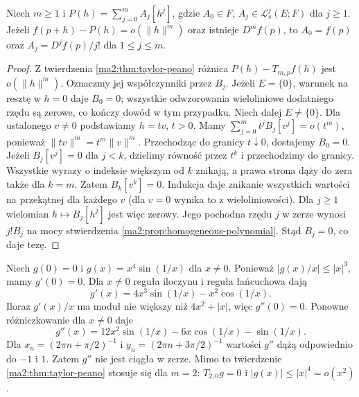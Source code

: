 \begin{stwierdzenie}
\label{ma2:prop:taylor-uniqueness}
Niech $m\ge1$ i $P(h)=\sum_{j=0}^m A_j[h^j]$,
gdzie $A_0\in F$, $A_j\in\mathcal L_s^j(E;F)$
dla $j\ge1$. Jeżeli $f(p+h)-P(h)=o(\|h\|^m)$
oraz istnieje $D^mf(p)$, to $A_0=f(p)$ oraz
$A_j=D^jf(p)/j!$ dla $1\le j\le m$.
\end{stwierdzenie}
\begin{proof}
Z twierdzenia \ref{ma2:thm:taylor-peano} różnica
$P(h)-T_{m,p}f(h)$ jest $o(\|h\|^m)$.
Oznaczmy jej współczynniki przez $B_j$.
Jeżeli $E=\{0\}$, warunek na resztę w $h=0$
daje $B_0=0$; wszystkie odwzorowania wieloliniowe
dodatniego rzędu są zerowe, co kończy dowód w tym przypadku.
Niech dalej $E\ne\{0\}$. Dla ustalonego $v\ne0$
podstawiamy $h=tv$, $t>0$. Mamy
$\sum_{j=0}^m t^j B_j[v^j]=o(t^m)$, ponieważ
$\|tv\|^m=t^m\|v\|^m$.
Przechodząc do granicy $t\downarrow0$, dostajemy $B_0=0$.
Jeżeli $B_j[v^j]=0$ dla $j<k$, dzielimy równość
przez $t^k$ i przechodzimy do granicy.
Wszystkie wyrazy o indeksie większym od $k$ znikają,
a prawa strona dąży do zera także dla $k=m$.
Zatem $B_k[v^k]=0$. Indukcja daje znikanie wszystkich
wartości na przekątnej dla każdego $v$ (dla $v=0$
wynika to z wieloliniowości).
Dla $j\ge1$ wielomian $h\mapsto B_j[h^j]$ jest więc
zerowy. Jego pochodna rzędu $j$ w zerze wynosi $j!B_j$
na mocy stwierdzenia \ref{ma2:prop:homogeneous-polynomial}.
Stąd $B_j=0$, co daje tezę.
\end{proof}

\begin{przyklad}
\label{ma2:ex:taylor-pointwise}
Niech $g(0)=0$ i $g(x)=x^4\sin(1/x)$ dla $x\ne0$.
Ponieważ $|g(x)/x|\le |x|^3$, mamy $g'(0)=0$.
Dla $x\ne0$ reguła iloczynu i reguła łańcuchowa dają
\[
 g'(x)=4x^3\sin(1/x)-x^2\cos(1/x).
\]
Iloraz $g'(x)/x$ ma moduł nie większy niż
$4x^2+|x|$, więc $g''(0)=0$.
Ponowne różniczkowanie dla $x\ne0$ daje
\[
 g''(x)=12x^2\sin(1/x)-6x\cos(1/x)-\sin(1/x).
\]
Dla $x_n=(2\pi n+\pi/2)^{-1}$ i
$y_n=(2\pi n+3\pi/2)^{-1}$ wartości $g''$
dążą odpowiednio do $-1$ i $1$. Zatem $g''$
nie jest ciągła w zerze. Mimo to twierdzenie
\ref{ma2:thm:taylor-peano} stosuje się dla $m=2$:
$T_{2,0}g=0$ i $|g(x)|\le |x|^4=o(x^2)$.
\end{przyklad}

